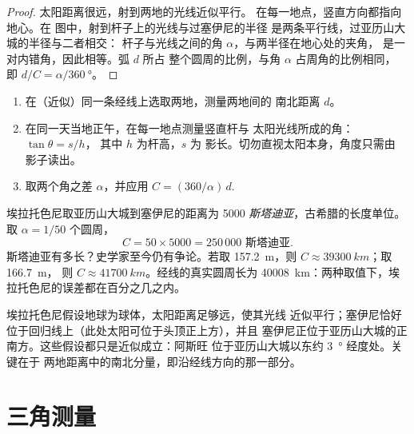 \begin{proof}
太阳距离很远，射到两地的光线近似平行。
在每一地点，竖直方向都指向地心。在
图中，射到杆子上的光线与过塞伊尼的半径
是两条平行线，过亚历山大城的半径与二者相交：
杆子与光线之间的角 $\alpha$，与两半径在地心处的夹角，
是一对内错角，因此相等。弧 $d$ 所占
整个圆周的比例，与角 $\alpha$ 占周角的比例相同，
即 $d/C = \alpha/\qty{360}{\degree}$。
\end{proof}

\begin{method}[由两个影子测量周长]\label{met:g10:measuring-the-earth:shadows}
\begin{enumerate}
  \item 在（近似）同一条经线上选取两地，测量两地间的
        南北距离 $d$。
  \item 在同一天当地正午，在每一地点测量竖直杆与
        太阳光线所成的角：$\tan \theta = s/h$，
        其中 $h$ 为杆高，$s$ 为
        影长。切勿直视太阳本身，角度只需由
        影子读出。
  \item 取两个角之差 $\alpha$，并应用
        $C = (360/\alpha)\,d$.
\end{enumerate}
\end{method}

\begin{example}[埃拉托色尼的数值]\label{ex:g10:measuring-the-earth:numbers}
埃拉托色尼取亚历山大城到塞伊尼的距离为 5000
\emph{斯塔迪亚}，古希腊的长度单位。取 $\alpha = 1/50$ 个圆周，
\[
  C = 50 \times 5000 = 250\,000 \text{ 斯塔迪亚}.
\]
斯塔迪亚有多长？史学家至今仍有争论。若取
\qty{157.2}{m}，则 $C \approx \qty{39300}{km}$；取 \qty{166.7}{m}，
则 $C \approx \qty{41700}{km}$。经线的真实圆周长为
\qty{40008}{km}：两种取值下，埃拉托色尼的误差都在百分之几之内。
\end{example}

\begin{remark}[所作假设]\label{rem:g10:measuring-the-earth:assumptions}
埃拉托色尼假设地球为球体，太阳距离足够远，使其光线
近似平行；塞伊尼恰好位于回归线上（此处太阳可位于头顶正上方），并且
塞伊尼正位于亚历山大城的正南方。这些假设都只是近似成立：阿斯旺
位于亚历山大城以东约 \qty{3}{\degree} 经度处。关键在于
两地距离中的南北分量，即沿经线方向的那一部分。
\end{remark}

\section{三角测量}

